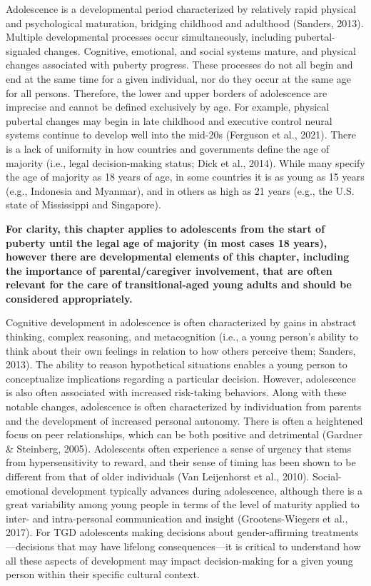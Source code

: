 \documentclass[
]{book}
\begin{document}
Adolescence is a developmental period characterized by relatively rapid physical and psychological maturation, bridging childhood and
adulthood (Sanders, 2013). Multiple developmental processes occur simultaneously, including
pubertal-signaled changes. Cognitive, emotional,
and social systems mature, and physical changes
associated with puberty progress. These processes do not all begin and end at the same
time for a given individual, nor do they occur
at the same age for all persons. Therefore, the
lower and upper borders of adolescence are
imprecise and cannot be defined exclusively by
age. For example, physical pubertal changes may
begin in late childhood and executive control
neural systems continue to develop well into the
mid-20s (Ferguson et al., 2021). There is a lack
of uniformity in how countries and governments
define the age of majority (i.e., legal
decision-making status; Dick et al., 2014). While
many specify the age of majority as 18 years of
age, in some countries it is as young as 15 years
(e.g., Indonesia and Myanmar), and in others
as high as 21 years (e.g., the U.S. state of
Mississippi and Singapore).

\textbf{For clarity, this chapter applies to adolescents
from the start of puberty until the legal age of
majority (in most cases 18 years), however there
are developmental elements of this chapter,
including the importance of parental/caregiver
involvement, that are often relevant for the care
of transitional-aged young adults and should
be considered appropriately.}

Cognitive development in adolescence is often
characterized by gains in abstract thinking, complex reasoning, and metacognition (i.e., a young
person's ability to think about their own feelings
in relation to how others perceive them; Sanders,
2013). The ability to reason hypothetical situations enables a young person to conceptualize
implications regarding a particular decision.
However, adolescence is also often associated with
increased risk-taking behaviors. Along with these
notable changes, adolescence is often characterized by individuation from parents and the development of increased personal autonomy. There
is often a heightened focus on peer relationships,
which can be both positive and detrimental
(Gardner \& Steinberg, 2005). Adolescents often
experience a sense of urgency that stems from
hypersensitivity to reward, and their sense of
timing has been shown to be different from that
of older individuals (Van Leijenhorst et al., 2010).
Social-emotional development typically advances
during adolescence, although there is a great variability among young people in terms of the level
of maturity applied to inter- and intra-personal
communication and insight (Grootens-Wiegers
et al., 2017). For TGD adolescents making decisions about gender-affirming treatments---decisions that may have lifelong consequences---it is
critical to understand how all these aspects of
development may impact decision-making for a
given young person within their specific cultural
context.
\end{document}
